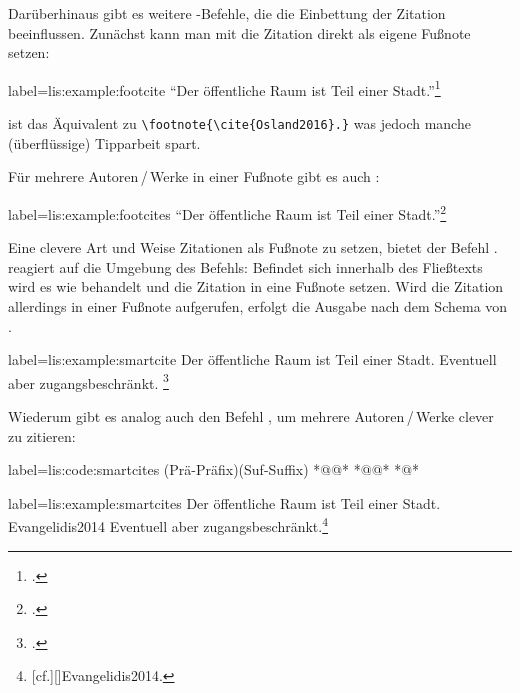 Darüberhinaus gibt es weitere -Befehle, 
die die Einbettung der Zitation beeinflussen. 
Zunächst kann man mit  die Zitation direkt als eigene Fußnote setzen:
\begin{lfgwexample}{label={lis:example:footcite}}
\enquote{Der öffentliche Raum ist Teil einer Stadt.}\footcite{Osland2016}
\end{lfgwexample}
 ist das Äquivalent zu \lstinline/\footnote{\cite{Osland2016}.}/
was jedoch manche (überflüssige) Tipparbeit spart.

Für mehrere Autoren\,/\,Werke in einer Fußnote gibt es auch :
\begin{lfgwexample}{label={lis:example:footcites}}
\enquote{Der öffentliche Raum ist Teil einer Stadt.}\footcites(s.)(){Osland2016}
[vgl.][]{Evangelidis2014}
\end{lfgwexample}
 
Eine clevere Art und Weise Zitationen als Fußnote zu setzen,
bietet der Befehl .
  reagiert auf die Umgebung des Befehls:
 Befindet sich  innerhalb des Fließtexts wird es wie  behandelt 
 und die Zitation in eine Fußnote setzen. 
Wird die Zitation allerdings in einer Fußnote aufgerufen,
erfolgt die Ausgabe nach dem Schema von . 

\begin{lfgwexample}{label={lis:example:smartcite}}
Der öffentliche Raum ist Teil einer Stadt.\smartcite{Osland2016} 
Eventuell aber zugangsbeschränkt. \footnote{\smartcite[vgl.][] {Evangelidis2014}.}
\end{lfgwexample}

Wiederum gibt es analog auch den Befehl , 
um mehrere Autoren\,/\,Werke clever zu zitieren:
\begin{lfgwcode}{label={lis:code:smartcites}}
\smartcites(Prä-Präfix)(Suf-Suffix)%
  *@@*%
  *@@*%
  *@\ldots@*
\end{lfgwcode}
\begin{lfgwexample}{label={lis:example:smartcites}}
Der öffentliche Raum ist Teil einer Stadt. {Evangelidis2014} 
Eventuell aber zugangsbeschränkt.\footnote{ 
[cf.][]{Evangelidis2014}.}
\end{lfgwexample}

